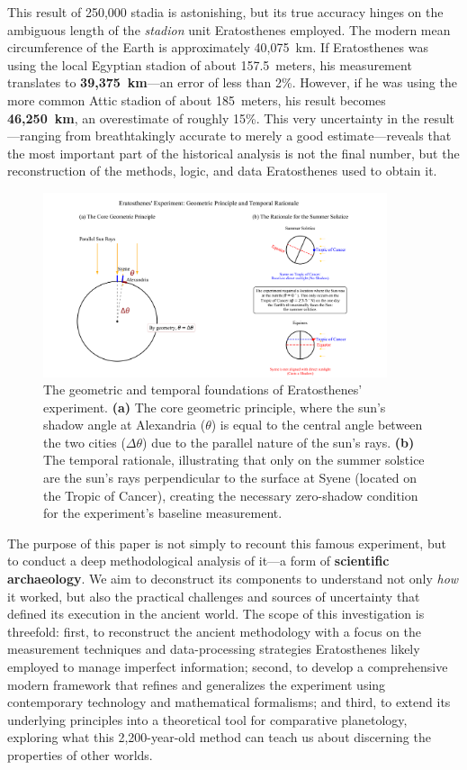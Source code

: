 \documentclass[11pt]{article}
\begin{document}
This result of 250,000 stadia is astonishing, but its true accuracy hinges on the ambiguous length of the \textit{stadion} unit Eratosthenes employed. The modern mean circumference of the Earth is approximately 40,075~km. If Eratosthenes was using the local Egyptian stadion of about 157.5~meters, his measurement translates to \textbf{39,375~km}—an error of less than 2\%. However, if he was using the more common Attic stadion of about 185~meters, his result becomes \textbf{46,250~km}, an overestimate of roughly 15\%. This very uncertainty in the result—ranging from breathtakingly accurate to merely a good estimate—reveals that the most important part of the historical analysis is not the final number, but the reconstruction of the methods, logic, and data Eratosthenes used to obtain it.

\begin{figure}[htbp]
    \centering
    \includegraphics[width=0.9\textwidth]{figures/Eratosthenes_Experiment_Final_Corrected.png}
    \caption{
        The geometric and temporal foundations of Eratosthenes' experiment. 
        \textbf{(a)} The core geometric principle, where the sun's shadow angle at Alexandria ($\theta$) is equal to the central angle between the two cities ($\Delta\theta$) due to the parallel nature of the sun's rays. 
        \textbf{(b)} The temporal rationale, illustrating that only on the summer solstice are the sun's rays perpendicular to the surface at Syene (located on the Tropic of Cancer), creating the necessary zero-shadow condition for the experiment's baseline measurement.
    }
    \label{fig:geo_rationale}
\end{figure}

The purpose of this paper is not simply to recount this famous experiment, but to conduct a deep methodological analysis of it—a form of \textbf{scientific archaeology}. We aim to deconstruct its components to understand not only \textit{how} it worked, but also the practical challenges and sources of uncertainty that defined its execution in the ancient world. The scope of this investigation is threefold: first, to reconstruct the ancient methodology with a focus on the measurement techniques and data-processing strategies Eratosthenes likely employed to manage imperfect information; second, to develop a comprehensive modern framework that refines and generalizes the experiment using contemporary technology and mathematical formalisms; and third, to extend its underlying principles into a theoretical tool for comparative planetology, exploring what this 2,200-year-old method can teach us about discerning the properties of other worlds.
\end{document}

